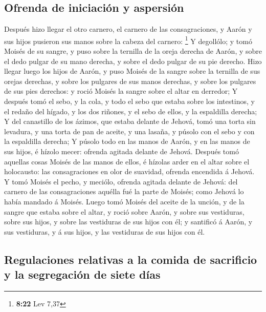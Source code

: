 \hypertarget{ofrenda-de-iniciaciuxf3n-y-aspersiuxf3n}{%
\subsection{Ofrenda de iniciación y
aspersión}\label{ofrenda-de-iniciaciuxf3n-y-aspersiuxf3n}}

 Después hizo llegar el otro carnero, el carnero de las
consagraciones, y Aarón y sus hijos pusieron sus manos sobre la cabeza
del carnero: \footnote{\textbf{8:22} Lev 7,37}  Y
degollólo; y tomó Moisés de su sangre, y puso sobre la ternilla de la
oreja derecha de Aarón, y sobre el dedo pulgar de su mano derecha, y
sobre el dedo pulgar de su pie derecho.  Hizo llegar luego
los hijos de Aarón, y puso Moisés de la sangre sobre la ternilla de sus
orejas derechas, y sobre los pulgares de sus manos derechas, y sobre los
pulgares de sus pies derechos: y roció Moisés la sangre sobre el altar
en derredor;  Y después tomó el sebo, y la cola, y todo el
sebo que estaba sobre los intestinos, y el redaño del hígado, y los dos
riñones, y el sebo de ellos, y la espaldilla derecha;  Y
del canastillo de los ázimos, que estaba delante de Jehová, tomó una
torta sin levadura, y una torta de pan de aceite, y una lasaña, y púsolo
con el sebo y con la espaldilla derecha;  Y púsolo todo en
las manos de Aarón, y en las manos de sus hijos, é hízolo mecer: ofrenda
agitada delante de Jehová.  Después tomó aquellas cosas
Moisés de las manos de ellos, é hízolas arder en el altar sobre el
holocausto: las consagraciones en olor de suavidad, ofrenda encendida á
Jehová.  Y tomó Moisés el pecho, y meciólo, ofrenda agitada
delante de Jehová: del carnero de las consagraciones aquélla fué la
parte de Moisés; como Jehová lo había mandado á Moisés. 
Luego tomó Moisés del aceite de la unción, y de la sangre que estaba
sobre el altar, y roció sobre Aarón, y sobre sus vestiduras, sobre sus
hijos, y sobre las vestiduras de sus hijos con él; y santificó á Aarón,
y sus vestiduras, y á sus hijos, y las vestiduras de sus hijos con él.

\hypertarget{regulaciones-relativas-a-la-comida-de-sacrificio-y-la-segregaciuxf3n-de-siete-duxedas}{%
\subsection{Regulaciones relativas a la comida de sacrificio y la
segregación de siete
días}\label{regulaciones-relativas-a-la-comida-de-sacrificio-y-la-segregaciuxf3n-de-siete-duxedas}}

